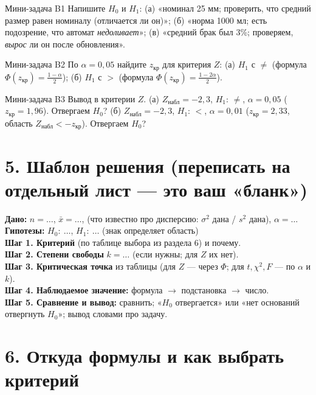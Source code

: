 \documentclass[a4paper,11pt]{extarticle}
\newcommand{\kr}{\text{кр}}\newcommand{\nab}{\text{набл}}
\begin{document}
\begin{task}{Мини-задача B1}
Напишите $H_0$ и $H_1$: (а) «номинал 25 мм; проверить, что средний размер равен номиналу (отличается ли он)»; (б) «норма 1000 мл; есть подозрение, что автомат \emph{недоливает}»; (в) «средний брак был 3\%; проверяем, \emph{вырос} ли он после обновления».
\end{task}
\begin{task}{Мини-задача B2}
По $\alpha=0{,}05$ найдите $z_\kr$ для критерия $Z$: (а) $H_1$ с $\ne$ (формула $\Phi(z_\kr)=\frac{1-\alpha}{2}$); (б) $H_1$ с $>$ (формула $\Phi(z_\kr)=\frac{1-2\alpha}{2}$).
\end{task}
\begin{task}{Мини-задача B3}
Вывод в критерии $Z$. (а) $Z_\nab=-2{,}3$, $H_1$: $\ne$, $\alpha=0{,}05$ ($z_\kr=1{,}96$). Отвергаем $H_0$? \quad (б) $Z_\nab=-2{,}3$, $H_1$: $<$, $\alpha=0{,}01$ ($z_\kr=2{,}33$, область $Z_\nab<-z_\kr$). Отвергаем $H_0$?
\end{task}

\section*{5. Шаблон решения (переписать на отдельный лист --- это ваш «бланк»)}
\begin{tmpl}
\textbf{Дано:} $n=\dots$, $\bar x=\dots$, (что известно про дисперсию: $\sigma^2$ дана / $s^2$ дана), $\alpha=\dots$\\
\textbf{Гипотезы:} $H_0:\ \dots$, \quad $H_1:\ \dots$ (знак определяет область)\\
\textbf{Шаг 1. Критерий} (по таблице выбора из раздела 6) и почему.\\
\textbf{Шаг 2. Степени свободы} $k=\dots$ (если нужны; для $Z$ их нет).\\
\textbf{Шаг 3. Критическая точка} из таблицы (для $Z$ --- через $\Phi$; для $t,\chi^2,F$ --- по $\alpha$ и $k$).\\
\textbf{Шаг 4. Наблюдаемое значение:} формула $\to$ подстановка $\to$ число.\\
\textbf{Шаг 5. Сравнение и вывод:} сравнить; «$H_0$ отвергается» или «нет оснований отвергнуть $H_0$»; вывод словами про задачу.
\end{tmpl}

\section*{6. Откуда формулы и как выбрать критерий}
\end{document}
